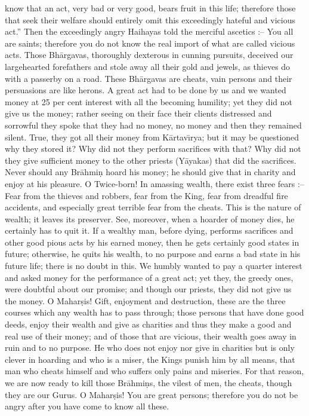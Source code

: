 know that an act, very bad or very good, bears fruit in this life; therefore those that seek their welfare should entirely omit this exceedingly hateful and vicious act.'' Then the exceedingly angry Haihayas told the merciful ascetics :-- You all are saints; therefore you do not know the real import of what are called vicious acts. Those Bh\=argavas, thoroughly dexterous in cunning pursuits, deceived our largehearted forefathers and stole away all their gold and jewels, as thieves do with a passerby on a road. These Bh\=argavas are cheats, vain persons and their persuasions are like herons. A great act had to be done by us and we wanted money at 25 per cent interest with all the becoming humility; yet they did not give us the money; rather seeing on their face their clients distressed and sorrowful they spoke that they had no money, no money and then they remained silent. True, they got all their money from K\=artav\={\i}rya; but it may be questioned why they stored it? Why did not they perform sacrifices with that? Why did not they give sufficient money to the other priests (Y\=ayakas) that did the sacrifices. Never should any Br\=ahmi\d{n} hoard his money; he should give that in charity and enjoy at his pleasure. O Twice-born! In amassing wealth, there exist three fears :-- Fear from the thieves and robbers, fear from the King, fear from dreadful fire accidents, and especially great terrible fear from the cheats. This is the nature of wealth; it leaves its preserver. See, moreover, when a hoarder of money dies, he certainly has to quit it. If a wealthy man, before dying, performs sacrifices and other good pious acts by his earned money, then he gets certainly good states in future; otherwise, he quits his wealth, to no purpose and earns a bad state in his future life; there is no doubt in this. We humbly wanted to pay a quarter interest and asked money for the performance of a great act; yet they, the greedy ones, were doubtful about our promise; and though our priests, they did not give us the money. O Mahar\d{s}is! Gift, enjoyment and destruction, these are the three courses which any wealth has to pass through; those persons that have done good deeds, enjoy their wealth and give as charities and thus they make a good and real use of their money; and of those that are vicious, their wealth goes away in ruin and to no purpose. He who does not enjoy nor give in charities but is only clever in hoarding and who is a miser, the Kings punish him by all means, that man who cheats himself and who suffers only pains and miseries. For that reason, we are now ready to kill those Br\=ahmi\d{n}s, the vilest of men, the cheats, though they are our Gurus. O Mahar\d{s}is! You are great persons; therefore you do not be angry after you have come to know all these.

